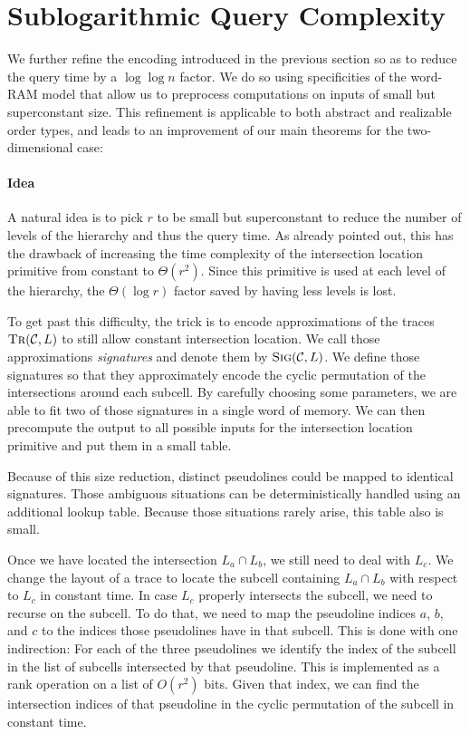 \section{Sublogarithmic Query Complexity}%
\label{sec:query-time}

We further refine the encoding introduced in the previous section so as to
reduce the query time by a \( \log\log n \) factor. We do so using
specificities of the word-RAM model that allow us to preprocess computations
on inputs of small but superconstant size.
%
This refinement is applicable to both abstract and realizable order types,
and leads to an improvement of our main theorems for the two-dimensional case:
%
\restate{\TheoremGPTAbstractLogLog*}
\restate{\TheoremGPTRealizableLogLog*}


\paragraph{Idea}

A natural idea is to pick \(r\) to be small but superconstant to reduce the
number of levels of the hierarchy and thus the query time. As already pointed
out, this has the drawback of increasing the time complexity of the intersection
location primitive from constant to \(\Theta(r^2)\).
Since this primitive is used at each level of the hierarchy, the
\(\Theta(\log r)\) factor saved by having less levels is lost.

To get past this difficulty,
the trick is to encode approximations of the traces
\(\textsc{Tr}(\mathcal{C}, L)\) to still allow constant intersection location.
We call those approximations \emph{signatures} and denote them by
\(\textsc{Sig}(\mathcal{C}, L)\).
%
We define those signatures so that they approximately encode the cyclic
permutation of the intersections around each subcell. By carefully choosing some
parameters, we are able to fit two of those signatures in a single word of
memory. We can then precompute the output to all
possible inputs for the intersection location primitive and put them in a small
table.

Because of this size reduction, distinct pseudolines could
be mapped to identical signatures.
%
Those ambiguous situations can be deterministically handled using
an additional lookup table.
%
Because those situations rarely arise, this table also is small.

Once we have located the intersection \(L_a \cap L_b\), we still need to deal
with \(L_c\). We change the layout of a trace to locate the subcell containing
\(L_a \cap L_b\) with respect to \(L_c\) in constant time.
%
In case \(L_c\) properly intersects the subcell, we need to recurse on the
subcell. To do that, we need to map the pseudoline indices \(a\), \(b\), and
\(c\) to the indices those pseudolines have in that subcell. This is
done with one indirection:
%
For each of the three pseudolines we
identify the index of the subcell in the list of subcells intersected by that
pseudoline.
This is implemented as a rank operation on a list of \(O(r^2)\) bits.
%
Given that index, we can find the intersection indices of that pseudoline in
the cyclic permutation of the subcell in constant time.

